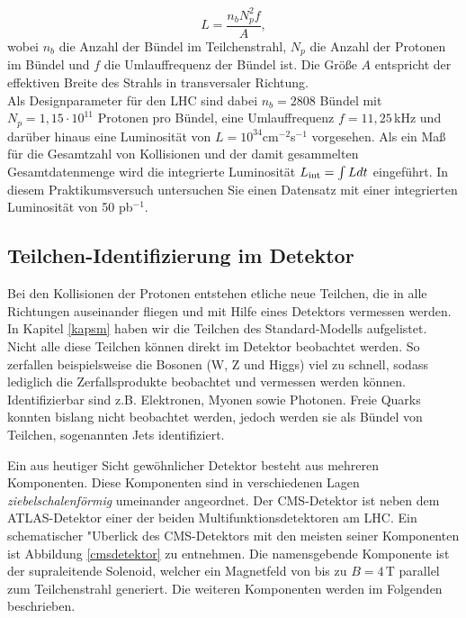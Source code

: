 \begin{equation}
L=\frac{n_{b}N_{p}^{2}f}{A},
\end{equation}
wobei $n_{b}$ die Anzahl der B\"undel im Teilchenstrahl, $N_{p}$ die Anzahl der Protonen im B\"undel und $f$ die Umlauffrequenz der B\"undel ist. Die Gr\"o\ss{}e $A$ entspricht der effektiven Breite des Strahls in transversaler Richtung.\\
Als Designparameter f\"ur den LHC sind dabei $n_{b}=2808$ B\"undel mit $N_{p}=1,15\cdot 10^{11}$ Protonen pro B\"undel, eine Umlauffrequenz $f=11,25$\,kHz und dar\"uber hinaus eine Luminosit\"at von $L=10^{34}$cm$^{-2}$s$^{-1}$ vorgesehen. Als ein Ma\ss{} f\"ur die Gesamtzahl von Kollisionen und der damit gesammelten Gesamtdatenmenge wird die integrierte Luminosit\"at $L_{\rm{int}}=\int L dt$ eingef\"uhrt. In diesem Praktikumsversuch untersuchen Sie einen Datensatz mit einer integrierten Luminosit\"at von 50 pb$^{-1}$.

\subsection{Teilchen-Identifizierung im Detektor}
Bei den Kollisionen der Protonen entstehen etliche neue Teilchen, die in alle Richtungen auseinander fliegen und mit Hilfe eines Detektors vermessen werden. In Kapitel \ref{kapsm} haben wir die Teilchen des Standard-Modells aufgelistet. Nicht alle diese Teilchen k\"onnen direkt im Detektor beobachtet werden. So zerfallen beispielsweise die Bosonen (W, Z und Higgs) viel zu schnell, sodass lediglich die Zerfallsprodukte beobachtet und vermessen werden k\"onnen. Identifizierbar sind z.B. Elektronen, Myonen sowie Photonen. Freie Quarks konnten bislang nicht beobachtet werden, jedoch werden sie als B\"undel von Teilchen, sogenannten Jets identifiziert.

Ein aus heutiger Sicht gew\"ohnlicher Detektor besteht aus mehreren Komponenten. Diese Komponenten sind in verschiedenen Lagen \textit{ziebelschalenf\"ormig} umeinander angeordnet. Der CMS-Detektor ist neben dem ATLAS-Detektor einer der beiden Multifunktionsdetektoren am LHC. Ein schematischer "Uberlick des CMS-Detektors mit den meisten seiner Komponenten ist Abbildung \ref{cmsdetektor} zu entnehmen. Die namensgebende Komponente ist der supraleitende Solenoid, welcher ein Magnetfeld von bis zu $B=4$\,T parallel zum Teilchenstrahl generiert. Die weiteren Komponenten werden im Folgenden beschrieben.\\

